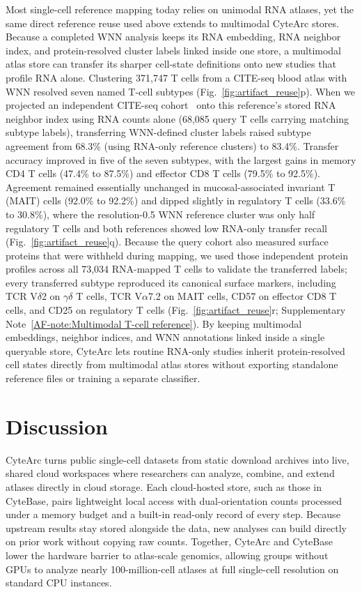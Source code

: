 \documentclass[11pt]{article}
\newcommand{\sref}[1]{\ref*{AF-#1}}
\begin{document}
Most single-cell reference mapping today relies on unimodal RNA atlases, yet the same direct reference reuse used above extends to multimodal CyteArc stores. Because a completed WNN analysis keeps its RNA embedding, RNA neighbor index, and protein-resolved cluster labels linked inside one store, a multimodal atlas store can transfer its sharper cell-state definitions onto new studies that profile RNA alone. Clustering 371,747 T cells from a CITE-seq blood atlas with WNN resolved seven named T-cell subtypes (Fig.~\ref{fig:artifact_reuse}p). When we projected an independent CITE-seq cohort~\cite{hao2021} onto this reference's stored RNA neighbor index using RNA counts alone (68,085 query T cells carrying matching subtype labels), transferring WNN-defined cluster labels raised subtype agreement from 68.3\% (using RNA-only reference clusters) to 83.4\%. Transfer accuracy improved in five of the seven subtypes, with the largest gains in memory CD4 T cells (47.4\% to 87.5\%) and effector CD8 T cells (79.5\% to 92.5\%). Agreement remained essentially unchanged in mucosal-associated invariant T (MAIT) cells (92.0\% to 92.2\%) and dipped slightly in regulatory T cells (33.6\% to 30.8\%), where the resolution-0.5 WNN reference cluster was only half regulatory T cells and both references showed low RNA-only transfer recall (Fig.~\ref{fig:artifact_reuse}q). Because the query cohort also measured surface proteins that were withheld during mapping, we used those independent protein profiles across all 73,034 RNA-mapped T cells to validate the transferred labels; every transferred subtype reproduced its canonical surface markers, including TCR V\ensuremath{\delta}2 on \ensuremath{\gamma}\ensuremath{\delta} T cells, TCR V\ensuremath{\alpha}7.2 on MAIT cells, CD57 on effector CD8 T cells, and CD25 on regulatory T cells (Fig.~\ref{fig:artifact_reuse}r; Supplementary Note~\sref{note:Multimodal T-cell reference}). By keeping multimodal embeddings, neighbor indices, and WNN annotations linked inside a single queryable store, CyteArc lets routine RNA-only studies inherit protein-resolved cell states directly from multimodal atlas stores without exporting standalone reference files or training a separate classifier.

\FloatBarrier

\section*{Discussion}

CyteArc turns public single-cell datasets from static download archives into live, shared cloud workspaces where researchers can analyze, combine, and extend atlases directly in cloud storage. Each cloud-hosted store, such as those in CyteBase, pairs lightweight local access with dual-orientation counts processed under a memory budget and a built-in read-only record of every step. Because upstream results stay stored alongside the data, new analyses can build directly on prior work without copying raw counts. Together, CyteArc and CyteBase lower the hardware barrier to atlas-scale genomics, allowing groups without GPUs to analyze nearly 100-million-cell atlases at full single-cell resolution on standard CPU instances.
\end{document}
